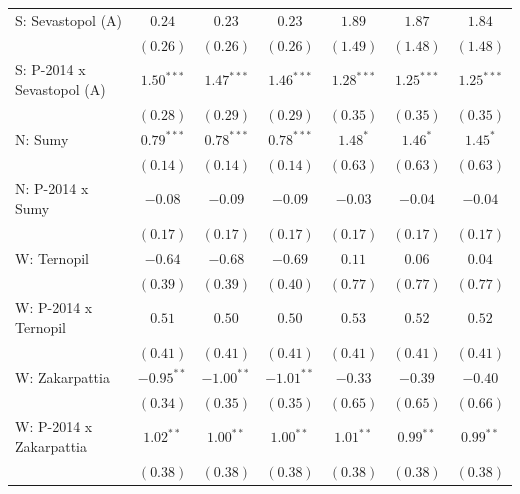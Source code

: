 \begin{table}
\begin{center}
\begin{small}
\begin{tabular}{l c c c c c c}
S: Sevastopol (A)           & $0.24$        & $0.23$        & $0.23$        & $1.89$       & $1.87$       & $1.84$       \\
                            & $(0.26)$      & $(0.26)$      & $(0.26)$      & $(1.49)$     & $(1.48)$     & $(1.48)$     \\
S: P-2014 x Sevastopol (A)  & $1.50^{***}$  & $1.47^{***}$  & $1.46^{***}$  & $1.28^{***}$ & $1.25^{***}$ & $1.25^{***}$ \\
                            & $(0.28)$      & $(0.29)$      & $(0.29)$      & $(0.35)$     & $(0.35)$     & $(0.35)$     \\
N: Sumy                     & $0.79^{***}$  & $0.78^{***}$  & $0.78^{***}$  & $1.48^{*}$   & $1.46^{*}$   & $1.45^{*}$   \\
                            & $(0.14)$      & $(0.14)$      & $(0.14)$      & $(0.63)$     & $(0.63)$     & $(0.63)$     \\
N: P-2014 x Sumy            & $-0.08$       & $-0.09$       & $-0.09$       & $-0.03$      & $-0.04$      & $-0.04$      \\
                            & $(0.17)$      & $(0.17)$      & $(0.17)$      & $(0.17)$     & $(0.17)$     & $(0.17)$     \\
W: Ternopil                 & $-0.64$       & $-0.68$       & $-0.69$       & $0.11$       & $0.06$       & $0.04$       \\
                            & $(0.39)$      & $(0.39)$      & $(0.40)$      & $(0.77)$     & $(0.77)$     & $(0.77)$     \\
W: P-2014 x Ternopil        & $0.51$        & $0.50$        & $0.50$        & $0.53$       & $0.52$       & $0.52$       \\
                            & $(0.41)$      & $(0.41)$      & $(0.41)$      & $(0.41)$     & $(0.41)$     & $(0.41)$     \\
W: Zakarpattia              & $-0.95^{**}$  & $-1.00^{**}$  & $-1.01^{**}$  & $-0.33$      & $-0.39$      & $-0.40$      \\
                            & $(0.34)$      & $(0.35)$      & $(0.35)$      & $(0.65)$     & $(0.65)$     & $(0.66)$     \\
W: P-2014 x Zakarpattia     & $1.02^{**}$   & $1.00^{**}$   & $1.00^{**}$   & $1.01^{**}$  & $0.99^{**}$  & $0.99^{**}$  \\
                            & $(0.38)$      & $(0.38)$      & $(0.38)$      & $(0.38)$     & $(0.38)$     & $(0.38)$     \\

\end{tabular}
\end{small}
\end{center}
\end{table}
